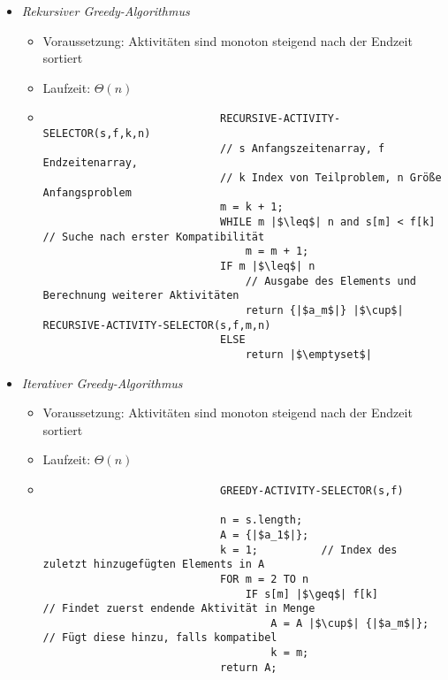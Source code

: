 \begin{itemize}
\begin{itemize}
                \item \textit{Rekursiver Greedy-Algorithmus}
                    \begin{itemize}
                        \item Voraussetzung: Aktivitäten sind monoton steigend nach der Endzeit sortiert
                        \item Laufzeit: $\Theta(n)$
                        \item[]
                            \begin{verbatim}
                            RECURSIVE-ACTIVITY-SELECTOR(s,f,k,n)
                            // s Anfangszeitenarray, f Endzeitenarray, 
                            // k Index von Teilproblem, n Größe Anfangsproblem
                            m = k + 1;
                            WHILE m |$\leq$| n and s[m] < f[k]  // Suche nach erster Kompatibilität
                                m = m + 1;
                            IF m |$\leq$| n
                                // Ausgabe des Elements und Berechnung weiterer Aktivitäten
                                return {|$a_m$|} |$\cup$| RECURSIVE-ACTIVITY-SELECTOR(s,f,m,n)
                            ELSE
                                return |$\emptyset$|
                            \end{verbatim}
                    \end{itemize}
                
                \item \textit{Iterativer Greedy-Algorithmus}
                    \begin{itemize}
                        \item Voraussetzung: Aktivitäten sind monoton steigend nach der Endzeit sortiert
                        \item Laufzeit: $\Theta(n)$
                        \item[]
                            \begin{verbatim}
                            GREEDY-ACTIVITY-SELECTOR(s,f)

                            n = s.length;
                            A = {|$a_1$|};
                            k = 1;          // Index des zuletzt hinzugefügten Elements in A
                            FOR m = 2 TO n                      
                                IF s[m] |$\geq$| f[k]           // Findet zuerst endende Aktivität in Menge
                                    A = A |$\cup$| {|$a_m$|};   // Fügt diese hinzu, falls kompatibel
                                    k = m;
                            return A;
                            \end{verbatim}
                    \end{itemize}
            \end{itemize}
    \end{itemize}

